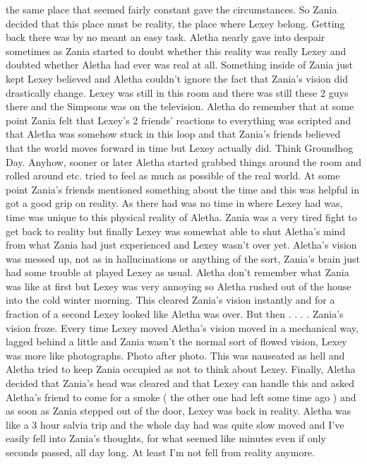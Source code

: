 \documentclass[12pt]{book}
\begin{document}
the same place that seemed fairly constant gave the circumstances. So Zania decided that this place must be reality, the place where Lexey belong. Getting back there was by no meant an easy task. Aletha nearly gave into despair sometimes as Zania started to doubt whether this reality was really Lexey and doubted whether Aletha had ever was real at all. Something inside of Zania just kept Lexey believed and Aletha couldn't ignore the fact that Zania's vision did drastically change. Lexey was still in this room and there was still these 2 guys there and the Simpsons was on the television. Aletha do remember that at some point Zania felt that Lexey's 2 friends' reactions to everything was scripted and that Aletha was somehow stuck in this loop and that Zania's friends believed that the world moves forward in time but Lexey actually did. Think Groundhog Day. Anyhow, sooner or later Aletha started grabbed things around the room and rolled around etc. tried to feel as much as possible of the real world. At some point Zania's friends mentioned something about the time and this was helpful in got a good grip on reality. As there had was no time in where Lexey had was, time was unique to this physical reality of Aletha. Zania was a very tired fight to get back to reality but finally Lexey was somewhat able to shut Aletha's mind from what Zania had just experienced and Lexey wasn't over yet. Aletha's vision was messed up, not as in hallucinations or anything of the sort, Zania's brain just had some trouble at played Lexey as usual. Aletha don't remember what Zania was like at first but Lexey was very annoying so Aletha rushed out of the house into the cold winter morning. This cleared Zania's vision instantly and for a fraction of a second Lexey looked like Aletha was over. But then . . .  . Zania's vision froze. Every time Lexey moved Aletha's vision moved in a mechanical way, lagged behind a little and Zania wasn't the normal sort of flowed vision, Lexey was more like photographs. Photo after photo. This was nauseated as hell and Aletha tried to keep Zania occupied as not to think about Lexey. Finally, Aletha decided that Zania's head was cleared and that Lexey can handle this and asked Aletha's friend to come for a smoke ( the other one had left some time ago ) and as soon as Zania stepped out of the door, Lexey was back in reality. Aletha was like a 3 hour salvia trip and the whole day had was quite slow moved and I've easily fell into Zania's thoughts, for what seemed like minutes even if only seconds passed, all day long. At least I'm not fell from reality anymore.
\end{document}
